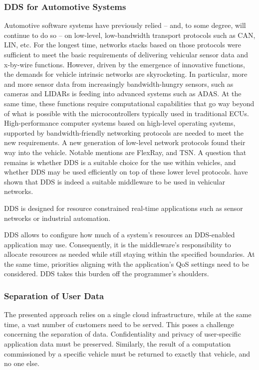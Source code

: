 \subsubsection{DDS for Automotive Systems}

Automotive software systems have previously relied -- and, to some degree, will continue to do so -- on low-level, low-bandwidth transport protocols such as CAN, LIN, etc. For the longest time, networks stacks based on those protocols were sufficient to meet the basic requirements of delivering vehicular sensor data and x-by-wire functions. However, driven by the emergence of innovative functions, the demands for vehicle intrinsic networks are skyrocketing. In particular, more and more sensor data from increasingly bandwidth-hungry sensors, such as cameras and LIDARs is feeding into advanced systems such as ADAS. At the same time, these functions require computational capabilities that go way beyond of what is possible with the microcontrollers typically used in traditional ECUs. High-performance computer systems based on high-level operating systems, supported by bandwidth-friendly networking protocols are needed to meet the new requirements. A new generation of low-level network protocols found their way into the vehicle. Notable mentions are FlexRay, and TSN. A question that remains is whether DDS is a suitable choice for the use within vehicles, and whether DDS may be used efficiently on top of these lower level protocols. \citeauthor*{bouhouch2013dds} have shown \cite{bouhouch2013dds} that DDS is indeed a suitable middleware to be used in vehicular networks.


DDS is designed for resource constrained real-time applications such as sensor networks or industrial automation.

DDS allows to configure how much of a system's resources an DDS-enabled application may use. Consequently, it is the middleware's responsibility to allocate resources as needed while still staying within the specified boundaries. At the same time, priorities aligning with the application's QoS settings need to be considered. DDS takes this burden off the programmer's shoulders.



\subsubsection{Separation of User Data}

The presented approach relies on a single cloud infrastructure, while at the same time, a vast number of customers need to be served. This poses a challenge concerning the separation of data. Confidentiality and privacy of user-specific application data must be preserved. Similarly, the result of a computation commissioned by a specific vehicle must be returned to exactly that vehicle, and no one else. 

